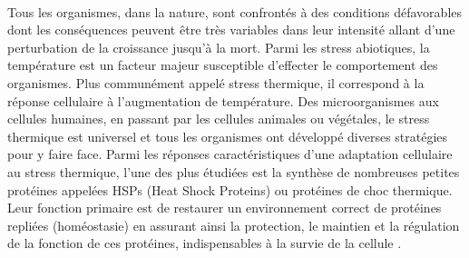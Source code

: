 

\paragraph*{} %
\label{par:intro1}

Tous les organismes, dans la nature, sont confrontés à des conditions défavorables dont les conséquences peuvent être très variables dans leur intensité allant d'une perturbation de la croissance jusqu'à la mort.
Parmi les stress abiotiques, la température est un facteur majeur susceptible d'effecter le comportement des organismes.
Plus communément appelé stress thermique, il correspond à la réponse cellulaire à l'augmentation de température.
Des microorganismes aux cellules humaines, en passant par les cellules animales ou végétales, le stress thermique est universel et tous les organismes ont développé diverses stratégies pour y faire face.
Parmi les réponses caractéristiques d'une adaptation cellulaire au stress thermique, l'une des plus étudiées est la synthèse de nombreuses petites protéines appelées HSPs (Heat Shock Proteins) ou protéines de choc thermique.
Leur fonction primaire est de restaurer un environnement correct de protéines repliées (homéostasie) en assurant ainsi la protection, le maintien et la régulation de la fonction de ces protéines, indispensables à la  survie de la cellule \cite{lindquist1988}.


